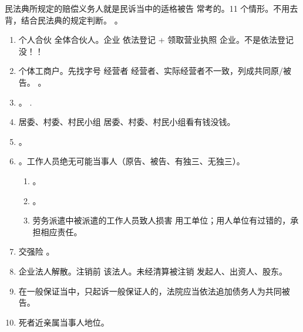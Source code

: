 \begin{enumerate}
\begin{enumerate}
                \begin{kk}{民法典所规定的赔偿义务人就是民诉当中的适格被告}
                  常考的。11 个情形。不用去背，结合民法典的规定判断。
                  。
                  \begin{enumerate}
                    \item 个人合伙 \yjt 全体合伙人。企业 \yjt 依法登记 + 领取营业执照 \yjt 企业。不是依法登记 \yjt 没！！
                    \item 个体工商户。先找字号 \yjt 经营者 \yjt 经营者、实际经营者不一致，列成共同原/被告。
                          。
                    \item {}。
                          .
                    \item 居委、村委、村民小组 \yjt 居委、村委、村民小组看有钱没钱。
                    \item {}。
                    \item {}。工作人员绝无可能当事人（原告、被告、有独三、无独三）。
                          \begin{enumerate}
                            \item {}。
                            \item {}。
                            \item 劳务派遣中被派遣的工作人员致人损害 \yjt 用工单位；用人单位有过错的，承担相应责任。
                          \end{enumerate}
                    \item 交强险 \yjt {}。
                    \item 企业法人解散。\yi 注销前 \yjt 该法人。\er 未经清算被注销 \yjt 发起人、出资人、股东。
                    \item 在一般保证当中，只起诉一般保证人的，法院应当依法追加债务人为共同被告。
                    \item 死者近亲属当事人地位。
                  \end{enumerate}
                \end{kk}


\end{enumerate}
\end{enumerate}
